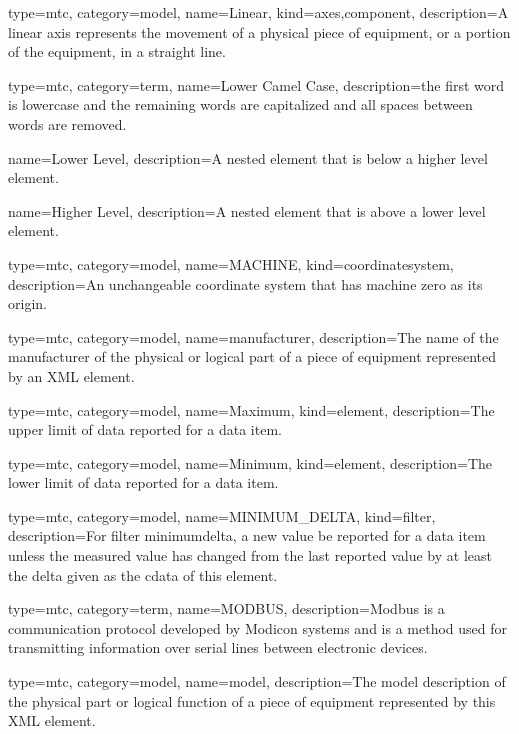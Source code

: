 {
  type=mtc,
  category=model,
  name={Linear},
  kind={axes,component},
  description={A \gls{linear} axis represents the movement of a physical piece of equipment, or a portion of the equipment, in a straight line. }
}


{
  type=mtc,
  category=term,
  name={Lower Camel Case},
  description={the first word is lowercase and the remaining words are capitalized and all spaces between words are removed.}
}


{
  name={Lower Level},
  description={A nested element that is below a higher level element.}
}


{
  name={Higher Level},
  description={A nested element that is above a lower level element.}
}


{
  type=mtc,
  category=model,
  name={MACHINE},
  kind={coordinatesystem},
  description={An unchangeable coordinate system that has machine zero as its origin.}
}


{
  type=mtc,
  category=model,
  name={manufacturer},
  description={The name of the manufacturer of the physical or logical part of a piece of equipment represented by an XML element.}
}


{
  type=mtc,
  category=model,
  name={Maximum},
  kind={element},
  description={The upper limit of data reported for a data item.}
}


{
  type=mtc,
  category=model,
  name={Minimum},
  kind={element},
  description={The lower limit of data reported for a data item.}
}



{
  type=mtc,
  category=model,
  name={MINIMUM\_DELTA},
  kind={filter},
  description={For \gls{filter} \gls{minimumdelta}, a new value \MUSTNOT be reported for a data item unless the measured value has changed from the last reported value by at least the delta given as the \gls{cdata} of this element.}
}


{
  type=mtc,
  category=term,
  name={MODBUS},
  description={Modbus is a communication protocol developed by Modicon systems and is a method used for transmitting information over serial lines between electronic devices.}
}


{
  type=mtc,
  category=model,
  name={model},
  description={The model description of the physical part or logical function of a piece of equipment represented by this XML element.}
}



